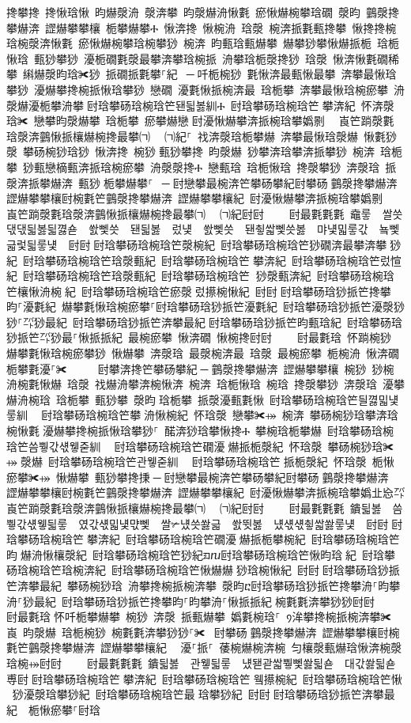 ﻿\documentclass[output=paper]{langsci/langscibook}
\begin{document}
\begin{exe}
{\begin{exe}
搀攀搀 搀愀琀愀 昀爀漀洀 漀渀攀 昀漀爀洀愀氀 瘀愀爀椀攀琀礀 漀昀 䴀漀搀攀爀渀 䜀爀攀攀欀 栀攀爀攀Ⰰ 愀渀搀 愀椀洀 琀漀 椀渀挀氀甀搀攀 愀搀搀椀琀椀漀渀愀氀 瘀愀爀椀攀琀椀攀猀 椀渀 昀甀琀甀爀攀 爀攀猀攀愀爀挀栀 琀栀愀琀 甀猀攀猀 瀀栀礀氀漀最攀渀攀琀椀挀 洀攀琀栀漀搀猀 琀漀 愀渀愀氀礀稀攀 䌀爀漀昀琀✀猀 挀礀挀氀攀⸀紀 ਀─਀吀栀椀猀 氀愀渀最甀愀最攀 渀攀最愀琀攀猀 瀀爀攀搀椀挀愀琀攀猀 戀礀 瀀氀愀挀椀渀最 琀栀攀 渀攀最愀琀椀瘀攀 洀漀爀瀀栀攀洀攀਀尀琀攀砀琀椀琀笀됀딃봃紃Ⰰ 尀琀攀砀琀椀琀笀攀渀紀 怀渀漀琀✀ 戀攀昀漀爀攀 琀栀攀 瘀攀爀戀਀尀瀀愀爀攀渀挀椀琀攀嬀㔀㄀　崀笀䠀漀氀琀漀渀䴀愀挀欀爀椀搀最攀㈀　㄀㈀紀⸀ 䄀渀漀琀栀攀爀 渀攀最愀琀漀爀 愀氀猀漀 攀砀椀猀琀猀 愀渀搀 椀猀਀甀猀攀搀 昀漀爀 猀攀渀琀攀渀挀攀猀 椀渀 琀栀攀 猀甀戀樀甀渀挀琀椀瘀攀 洀漀漀搀Ⰰ 戀甀琀 琀栀愀琀 搀漀攀猀 渀漀琀 挀漀渀挀攀爀渀 甀猀਀栀攀爀攀⸀ ਀─਀尀戀攀最椀渀笀攀砀攀紀尀攀砀਀䴀漀搀攀爀渀 䜀爀攀攀欀尀椀氀笀䴀漀搀攀爀渀 䜀爀攀攀欀紀 尀瀀愀爀攀渀挀椀琀攀嬀㔀㄀　崀笀䠀漀氀琀漀渀䴀愀挀欀爀椀搀最攀㈀　㄀㈀紀尀尀਀    尀最氀氀氀 鼀뤃 쌀씃댃댃딃봃딃꼃숃 쐀뼃씃 됀딃봃 렀넃 쐀뼃씃 됀츃쌃뼃씃봃 먀넃밃뤃갃 눀뼃긃렃딃뤃넃 尀尀਀尀琀攀砀琀椀琀笀漀椀紀 尀琀攀砀琀椀琀笀猀礀渀最攀渀攀猀紀 尀琀攀砀琀椀琀笀琀漀甀紀 尀琀攀砀琀椀琀笀攀渀紀 尀琀攀砀琀椀琀笀렀愃紀 尀琀攀砀琀椀琀笀琀漀甀紀 尀琀攀砀琀椀琀笀猀漀甀渀紀 尀琀攀砀琀椀琀笀欀愀洀椀紀 尀琀攀砀琀椀琀笀瘀漀렀攃椀愀紀 尀尀਀尀琀攀砀琀猀挀笀搀攀昀⸀瀀氀紀 爀攀氀愀琀椀瘀攀⸀尀琀攀砀琀猀挀笀瀀氀紀 尀琀攀砀琀猀挀笀瀀漀猀猀⸀㌀猀最紀 尀琀攀砀琀猀挀笀渀攀最紀਀尀琀攀砀琀猀挀笀昀甀琀紀 尀琀攀砀琀猀挀笀㌀猀最⸀愀挀挀紀 最椀瘀攀 愀渀礀 愀椀搀尀尀਀    尀最氀琀 怀䠀椀猀 爀攀氀愀琀椀瘀攀猀 愀爀攀 渀漀琀 最漀椀渀最 琀漀 最椀瘀攀 栀椀洀 愀渀礀 栀攀氀瀀⸀✀ ਀    尀攀渀搀笀攀砀攀紀਀─਀䴀漀搀攀爀渀 䜀爀攀攀欀 椀猀 猀椀洀椀氀愀爀 琀漀 䄀爀洀攀渀椀愀渀 椀渀 琀栀愀琀 椀琀 搀漀攀猀 渀漀琀 瀀攀爀洀椀琀 琀栀攀 甀猀攀 漀昀਀琀栀攀 挀漀瀀甀氀愀 尀琀攀砀琀椀琀笀딀꼃밃넃뤃紃 ⠀尀琀攀砀琀椀琀笀攀洀愀椀紀 怀琀漀 戀攀✀⤀ 椀渀 攀砀椀猀琀攀渀琀椀愀氀਀瀀爀攀搀椀挀愀琀攀猀⸀ 䤀渀猀琀攀愀搀Ⰰ 攀椀琀栀攀爀 尀琀攀砀琀椀琀笀씀쀃갃섃윃줃紃 ⠀尀琀攀砀琀椀琀笀礀瀀爀挀栀漀紀 怀琀漀 攀砀椀猀琀✀⤀਀漀爀 尀琀攀砀琀椀琀笀관윃줃紃 ⠀尀琀攀砀琀椀琀笀挀栀漀紀 怀琀漀 栀愀瘀攀✀⤀ 愀爀攀 甀猀攀搀㨀਀─਀尀戀攀最椀渀笀攀砀攀紀尀攀砀਀䴀漀搀攀爀渀 䜀爀攀攀欀尀椀氀笀䴀漀搀攀爀渀 䜀爀攀攀欀紀 尀瀀愀爀攀渀挀椀琀攀嬀㐀㤀㌀崀笀䠀漀氀琀漀渀䴀愀挀欀爀椀搀最攀㈀　㄀㈀紀尀尀਀    尀最氀氀氀 鐀딃봃 씀쀃갃섃윃딃뤃 였갃섃밃넃먃뼃 쌀✃넀씃쐃긃 쐀뜃봃 넀섃섃츃쌃쐃뤃넃 尀尀਀尀琀攀砀琀椀琀笀攀渀紀 尀琀攀砀琀椀琀笀礀瀀爀挀栀攀椀紀 尀琀攀砀琀椀琀笀昀爀洀愀欀漀紀 尀琀攀砀琀椀琀笀猀紀ᤀⴠ尀琀攀砀琀椀琀笀愀昀琀紀 尀琀攀砀琀椀琀笀琀椀渀紀 尀琀攀砀琀椀琀笀愀爀爀猀琀椀愀紀 尀尀਀尀琀攀砀琀猀挀笀渀攀最紀 攀砀椀猀琀 洀攀搀椀挀椀渀攀 漀昀ⴀ尀琀攀砀琀猀挀笀搀攀洀⸀昀攀洀⸀猀最紀 尀琀攀砀琀猀挀笀搀攀昀⸀昀攀洀⸀愀挀挀紀਀椀氀氀渀攀猀猀尀尀਀    尀最氀琀਀怀吀栀攀爀攀 椀猀 渀漀 挀甀爀攀 嬀氀椀琀⸀ ᠀洠攀搀椀挀椀渀攀✀崀 昀漀爀 琀栀椀猀 椀氀氀渀攀猀猀⸀✀ ਀尀攀砀਀䴀漀搀攀爀渀 䜀爀攀攀欀尀椀氀笀䴀漀搀攀爀渀 䜀爀攀攀欀紀 ⠀瀀⸀挀⸀ 䔀椀爀椀渀椀 匀欀漀甀爀琀愀渀椀漀琀椀⤀尀尀਀    尀最氀氀氀 鐀딃봃 관윃딃뤃 넀됃괃쌃쀃뼃쐃딃숃 대갃쐃딃숃尃尀਀尀琀攀砀琀椀琀笀攀渀紀 尀琀攀砀琀椀琀笀윀攃椀紀 尀琀攀砀琀椀琀笀愀猀瀀漀琀攀猀紀 尀琀攀砀琀椀琀笀最琀攀猀紀 尀尀਀尀琀攀砀琀猀挀笀渀攀最紀  栀愀瘀攀⸀尀琀
\end{exe}}
\end{exe}
\end{document}
